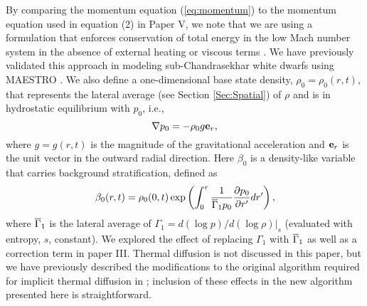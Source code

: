 By comparing the momentum equation (\ref{eq:momentum}) to the momentum equation used in equation (2) in Paper V, we
note that we are using a formulation that enforces conservation of total energy in the
low Mach number system in the absence of external heating or viscous terms \citep{kleinpauluis,Vasil2013}.
We have previously validated this approach in modeling sub-Chandrasekhar white dwarfs using MAESTRO \citep{subChandra_II}.
We also define a one-dimensional base state density, $\rho_0 = \rho_0(r,t)$, that represents the lateral average (see Section \ref{Sec:Spatial}) of $\rho$ and is in hydrostatic equilibrium with $p_0$, i.e.,
\begin{equation}
\nabla p_0 = -\rho_0 g\eb_r, \label{eq:HSE}
\end{equation}
where $g=g(r,t)$ is the magnitude of the gravitational acceleration and ${\bf{e}}_r$ is the unit vector in the outward radial direction.
Here $\beta_0$ is a density-like variable that carries background stratification, defined as
\begin{equation}
\beta_0(r,t) = \rho_0(0,t)\exp\left(\int_0^r\frac{1}{\gammaonebar p_0}\frac{\partial p_0}{\partial r'}dr'\right),
\end{equation}
where $\overline{\Gamma}_1$ is the lateral average of $\Gamma_1 = d(\log p)/d(\log\rho) |_s$ (evaluated with entropy, $s$, constant).  We explored the effect of
replacing $\Gamma_1$ with $\overline{\Gamma}_1$ as well as a correction term in paper III. 
Thermal diffusion is not discussed in this paper, but we have previously described the modifications to the original algorithm required
for implicit thermal diffusion in \cite{XRB_I}; inclusion of these effects in the new algorithm presented here is straightforward.

